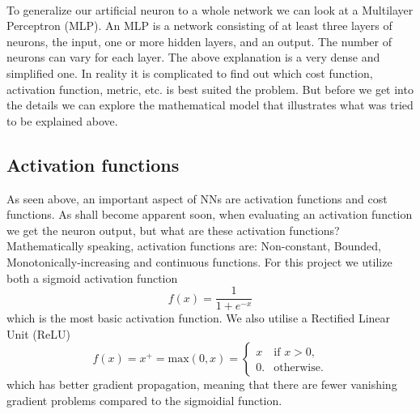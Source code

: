 \documentclass[14pt, a4paper]{book}
\begin{document}
\\To generalize our artificial neuron to a whole network we can look at a Multilayer Perceptron (MLP). An MLP is a network consisting of at least three layers of neurons, the input, one or more hidden layers, and an output. The number of neurons can vary for each layer. The above explanation is a very dense and simplified one. In reality it is complicated to find out which cost function, activation function, metric, etc. is best suited the problem. But before we get into the details we can explore the mathematical model that illustrates what was tried to be explained above. 


\subsection{Activation functions}
As seen above, an important aspect of NNs are activation functions and cost functions. As shall become apparent soon, when evaluating an activation function we get the neuron output, but what are these activation functions? Mathematically speaking, activation functions are: Non-constant, Bounded, Monotonically-increasing and continuous functions. For this project we utilize both a sigmoid activation function
\begin{equation}\label{eq:sig}
    f(x) = \frac{1}{1+e^{-x}}
\end{equation}
which is the most basic activation function. We also utilise a Rectified Linear Unit (ReLU)
\begin{equation}\label{eq:ReLU}
    f(x) = x^+ = \text{max}(0,x) = \begin{cases}x&{\text{if }}x>0,\\0.&{\text{otherwise}}.\end{cases}
\end{equation}
which has better gradient propagation, meaning that there are fewer vanishing gradient problems compared to the sigmoidial function.
\end{document}

